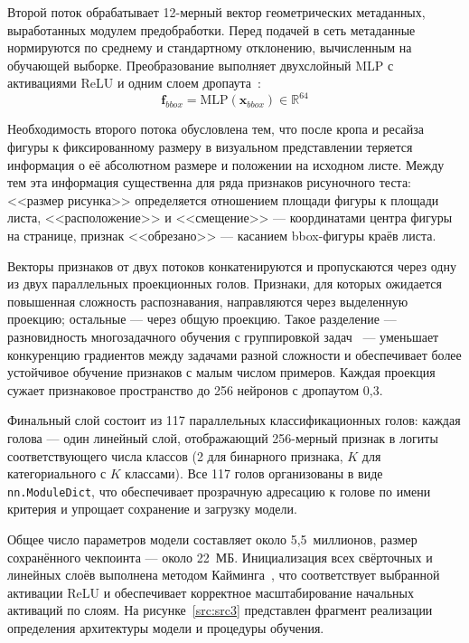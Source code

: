 Второй поток обрабатывает 12-мерный вектор геометрических метаданных, выработанных модулем предобработки. Перед подачей в сеть метаданные нормируются по среднему и стандартному отклонению, вычисленным на обучающей выборке. Преобразование выполняет двухслойный MLP с активациями ReLU и одним слоем дропаута~\cite{dropout}:
\begin{equation}
\mathbf{f}_{bbox} = \text{MLP}(\mathbf{x}_{bbox}) \in \mathbb{R}^{64}
\end{equation}

Необходимость второго потока обусловлена тем, что после кропа и ресайза фигуры к фиксированному размеру в визуальном представлении теряется информация о её абсолютном размере и положении на исходном листе. Между тем эта информация существенна для ряда признаков рисуночного теста: <<размер рисунка>> определяется отношением площади фигуры к площади листа, <<расположение>> и <<смещение>> --- координатами центра фигуры на странице, признак <<обрезано>> --- касанием bbox-фигуры краёв листа.

Векторы признаков от двух потоков конкатенируются и пропускаются через одну из двух параллельных проекционных голов. Признаки, для которых ожидается повышенная сложность распознавания, направляются через выделенную проекцию; остальные --- через общую проекцию. Такое разделение --- разновидность многозадачного обучения с группировкой задач~\cite{multitask-survey} --- уменьшает конкуренцию градиентов между задачами разной сложности и обеспечивает более устойчивое обучение признаков с малым числом примеров. Каждая проекция сужает признаковое пространство до 256 нейронов с дропаутом 0,3.

Финальный слой состоит из 117 параллельных классификационных голов: каждая голова --- один линейный слой, отображающий 256-мерный признак в логиты соответствующего числа классов (2 для бинарного признака, $K$ для категориального с $K$ классами). Все 117 голов организованы в виде \texttt{nn.ModuleDict}, что обеспечивает прозрачную адресацию к голове по имени критерия и упрощает сохранение и загрузку модели.

Общее число параметров модели составляет около 5,5~миллионов, размер сохранённого чекпоинта --- около 22~МБ. Инициализация всех свёрточных и линейных слоёв выполнена методом Кайминга~\cite{kaiming-init}, что соответствует выбранной активации ReLU и обеспечивает корректное масштабирование начальных активаций по слоям. На рисунке~\ref{src:src3} представлен фрагмент реализации определения архитектуры модели и процедуры обучения.

